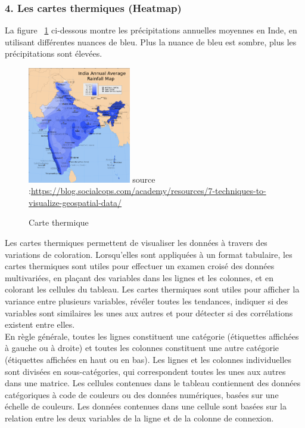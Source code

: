 \documentclass[french, a4paper, 12pt]{report}
\begin{document}
\subsubsection{4. Les cartes thermiques (Heatmap)}
La figure ~\ref{fig:2.11} ci-dessous montre les précipitations annuelles moyennes en Inde, en utilisant différentes nuances de bleu. Plus la nuance de bleu est sombre, plus les précipitations sont élevées.
\begin{figure}
\centering
\includegraphics[width=0.4\textwidth]{images/Heatmap.png}
\scriptsize{source :\url{https://blog.socialcops.com/academy/resources/7-techniques-to-visualize-geospatial-data/}}
\caption{\label{fig:2.11} Carte thermique}
\end{figure}
Les cartes thermiques permettent de visualiser les données à travers des variations de coloration. Lorsqu'elles sont appliquées à un format tabulaire, les cartes thermiques sont utiles pour effectuer un examen croisé des données multivariées, en plaçant des variables dans les lignes et les colonnes, et en colorant les cellules du tableau. Les cartes thermiques sont utiles pour afficher la variance entre plusieurs variables, révéler toutes les tendances, indiquer si des variables sont similaires les unes aux autres et pour détecter si des corrélations existent entre elles. \\

En règle générale, toutes les lignes constituent une catégorie (étiquettes affichées à gauche ou à droite) et toutes les colonnes constituent une autre catégorie (étiquettes affichées en haut ou en bas). Les lignes et les colonnes individuelles sont divisées en sous-catégories, qui correspondent toutes les unes aux autres dans une matrice. Les cellules contenues dans le tableau contiennent des données catégoriques à code de couleurs ou des données numériques, basées sur une échelle de couleurs. Les données contenues dans une cellule sont basées sur la relation entre les deux variables de la ligne et de la colonne de connexion.
\end{document}
